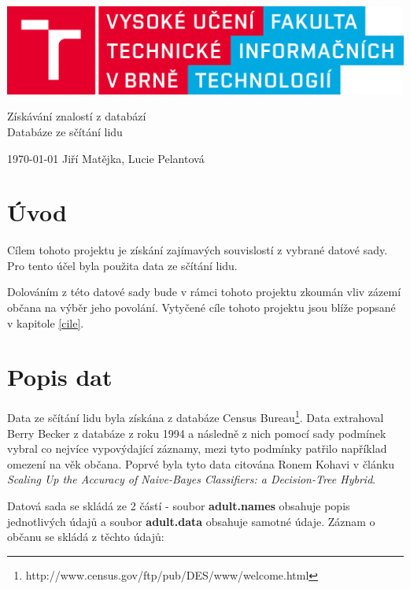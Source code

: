 \documentclass[11pt,a4paper,titlepage]{article}
\begin{document}
		\begin{center}

			\includegraphics[width = 150mm]{logo.png}\\


			\LARGE
			Získávání znalostí z databází\\
			Databáze ze sčítání lidu\\

		\end{center}

	\Large{\today} \hfill Jiří Matějka, Lucie Pelantová
	\thispagestyle{empty}
	\newpage
	\setcounter{page}{1}

    \section{Úvod}
        Cílem tohoto projektu je získání zajímavých souvislostí z vybrané datové sady. Pro tento 			účel byla použita data ze sčítání lidu.
        
        Dolováním z této datové sady bude v rámci tohoto projektu zkoumán vliv zázemí občana na výběr jeho povolání. Vytyčené cíle tohoto projektu jsou blíže popsané v kapitole \ref{cile}.
    
    \section{Popis dat}
    Data ze sčítání lidu byla získána z databáze Census Bureau\footnote{http://www.census.gov/ftp/pub/DES/www/welcome.html}. Data extrahoval Berry Becker z databáze z roku 1994 a následně z nich pomocí sady podmínek vybral co nejvíce vypovýdající záznamy, mezi tyto podmínky patřilo například omezení na věk občana. Poprvé byla tyto data citována Ronem Kohavi v článku \textit{Scaling Up the Accuracy of Naive-Bayes Classifiers: a Decision-Tree Hybrid}.
    
    
        Datová sada se skládá ze 2 částí - soubor \textbf{adult.names} obsahuje popis jednotlivých údajů a soubor \textbf{adult.data} obsahuje samotné údaje. Záznam o občanu se skládá z těchto údajů:
        
\end{document}
